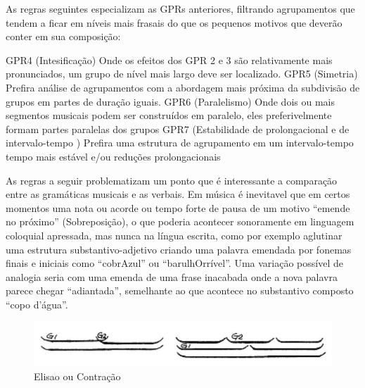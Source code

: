 \documentclass[
	12pt,				%
	openright,			%
	twoside,			%
	a4paper,			%
	english,			%
	french,				%
	spanish,			%
	brazil				%
	]{abntex2}
\begin{document}
As regras seguintes especializam as GPRs anteriores, filtrando agrupamentos que tendem a ficar em níveis mais frasais do que os pequenos motivos que deverão conter em sua composição:

\begin{citacao}
GPR4 (Intesificação) Onde os efeitos dos GPR 2 e 3 são relativamente mais pronunciados, um grupo de nível mais largo deve ser localizado.\linebreak
GPR5 (Simetria) Prefira análise de agrupamentos com a abordagem mais próxima da subdivisão de grupos em partes de duração iguais.\linebreak
GPR6 (Paralelismo) Onde dois ou mais segmentos musicais podem ser construídos em paralelo, eles preferivelmente formam partes paralelas dos grupos\linebreak
GPR7 (Estabilidade de prolongacional e de intervalo-tempo ) Prefira uma estrutura de agrupamento em um intervalo-tempo tempo mais estável e/ou reduções prolongacionais
\cite[ pg.46-52]{lerdahl1983generative}
\end{citacao}

As regras a seguir problematizam um ponto que é interessante a comparação entre as gramáticas musicais e as verbais. Em música é inevitavel que em certos momentos uma nota ou acorde ou tempo forte de pausa de um motivo “emende no próximo” (Sobreposição), o que poderia acontecer sonoramente em linguagem coloquial apressada, mas nunca na língua escrita, como por exemplo aglutinar uma estrutura substantivo-adjetivo criando uma palavra emendada por fonemas finais e iniciais como “cobrAzul” ou “barulhOrrível”. Uma variação possível de analogia seria com uma emenda de uma frase inacabada onde a nova palavra parece chegar “adiantada”, semelhante ao que acontece no substantivo composto “copo d'água”. 

\begin{figure}[htb]
	\caption{\label{fig_grafico}Elisao ou Contração}
	\begin{center}
	    \includegraphics[scale=0.5]{gttm/GWFRfig32.png}
	\end{center}
\end{figure}
\end{document}
